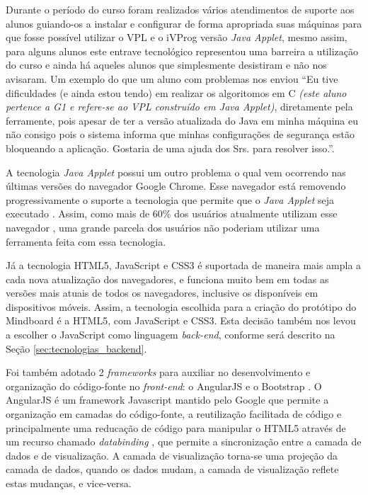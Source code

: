 Durante o período do curso foram realizados vários atendimentos de suporte aos alunos guiando-os a instalar e configurar de forma apropriada suas máquinas para que fosse possível utilizar o VPL e o iVProg versão \emph{Java Applet}, mesmo assim, para alguns alunos este entrave tecnológico representou uma barreira a utilização do curso e ainda há aqueles alunos que simplesmente desistiram e não nos avisaram. Um exemplo do que um aluno com problemas nos enviou ``Eu tive dificuldades (e ainda estou tendo) em realizar os algoritomos em C \emph{(este aluno pertence a G1 e refere-se ao VPL construído em Java Applet)}, diretamente pela ferramente, pois apesar de ter a versão atualizada do Java em minha máquina eu não consigo pois o sistema informa que minhas configurações de segurança estão bloqueando a aplicação. Gostaria de uma ajuda dos Srs. para resolver isso.''. 

A tecnologia \emph{Java Applet} possui um outro problema o qual vem ocorrendo nas últimas versões do navegador Google Chrome. Esse navegador está removendo progressivamente o suporte a tecnologia que permite que o \emph{Java Applet} seja executado \cite{java_chrome}. Assim, como mais de 60\% dos usuários atualmente utilizam esse navegador \cite{browser_stats}, uma grande parcela dos usuários não poderiam utilizar uma ferramenta feita com essa tecnologia.

Já a tecnologia HTML5, JavaScript e CSS3 é suportada de maneira mais ampla a cada nova atualização dos navegadores, e funciona muito bem em todas as versões mais atuais de todos os navegadores, inclusive os disponíveis em dispositivos móveis. Assim, a tecnologia escolhida para a criação do protótipo do Mindboard é a HTML5, com JavaScript e CSS3. Esta decisão também nos levou a escolher o JavaScript como linguagem \emph{back-end}, conforme será descrito na Seção \ref{sec:tecnologias_backend}.

Foi também adotado 2 \emph{frameworks} para auxiliar no desenvolvimento e organização do código-fonte no \emph{front-end}: o AngularJS \cite{angularjs} e o Bootstrap \cite{bootstrap}. O AngularJS é um framework Javascript mantido pelo Google que permite a organização em camadas do código-fonte, a reutilização facilitada de código e principalmente uma reducação de código para manipular o HTML5 através de um recurso chamado \emph{databinding} \cite{databinding}, que permite a sincronização entre a camada de dados e de visualização. A camada de visualização torna-se uma projeção da camada de dados, quando os dados mudam, a camada de visualização reflete estas mudanças, e vice-versa.

